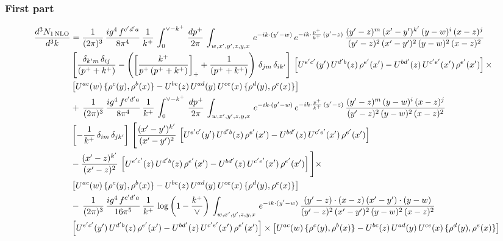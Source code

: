 \documentclass[9pt]{article}
\numberwithin{equation}{section}
\begin{document}
\subsubsection{First part}
\begin{align}
     \frac{d^{3}N_{1\,\rm NLO}}{d^{3}k} & =  \frac{1}{(2\pi)^{3}}\, \frac{ig^{4}\,f^{c'd'a}}{8\pi^{4}}\, \frac{1}{k^{+}}\,\int_{0}^{\vee-k^{+}}\,  \frac{dp^{+}}{2\pi}\, \int_{w,x',y',z,y,x}\, e^{-ik\cdot (y'-w)}\, e^{-ik\cdot \frac{p^{+}}{k^{+}}\,(y'-z)}\,\frac{(y'-z)^{m}\,(x'-y')^{k'}\,(y-w)^{i}\,(x-z)^{j}}{(y'-z)^{2}\,(x'-y')^{2}\,(y-w)^{2}\,(x-z)^{2}}\notag \\ & \left[\frac{\delta_{k'm}\,\delta_{ij}}{(p^{+}+k^{+})}-\left(\left[\frac{k^{+}}{p^{+}\,(p^{+}+k^{+})}\right]_{+}+\frac{1}{(p^{+}+k^{+})}\right)\,\delta_{jm}\,\delta_{ik'}\right]\, \left[U^{e'c'}(y')\,U^{d'b}(z)\,\rho^{e'}(x')-U^{bd'}(z)\,U^{c'e'}(x')\,\rho^{e'}(x')\right]\times\notag \\ &  \left[U^{ac}(w)\, \{\rho^{c}(y),\rho^{b}(x)\}-U^{bc}(z)\,U^{ad}(y)\,U^{ce}(x)\,\{\rho^{d}(y),\rho^{e}(x)\}\right] \notag \\
&  +\,\frac{1}{(2\pi)^{3}}\, \frac{ig^{4}\,f^{c'd'a}}{8\pi^{4}}\, \frac{1}{k^{+}}\,\int_{0}^{\vee-k^{+}}\,  \frac{dp^{+}}{2\pi}\, \int_{w,x',y',z,y,x}\, e^{-ik\cdot (y'-w)}\, e^{-ik\cdot \frac{p^{+}}{k^{+}}\,(y'-z)}\,\frac{(y'-z)^{m}\,(y-w)^{i}\,(x-z)^{j}}{(y'-z)^{2}\,(y-w)^{2}\,(x-z)^{2}}\notag \\ &   \left[-\frac{1}{k^{+}}\, \delta_{im}\, \delta_{jk'}\right]\, \Bigg[\frac{(x'-y')^{k'}}{(x'-y')^{2}}\,\left[U^{e'c'}(y')\,U^{d'b}(z)\,\rho^{e'}(x')-U^{bd'}(z)\,U^{c'e'}(x')\,\rho^{e'}(x')\right]\notag \\ & -\frac{(x'-z)^{k'}}{(x'-z)^{2}}\,\left[U^{e'c'}(z)\,U^{d'b}(z)\,\rho^{e'}(x')-U^{bd'}(z)\,U^{c'e'}(x')\,\rho^{e'}(x')\right]\Bigg]\times\notag \\ &   \left[U^{ac}(w)\, \{\rho^{c}(y),\rho^{b}(x)\}-U^{bc}(z)\,U^{ad}(y)\,U^{ce}(x)\,\{\rho^{d}(y),\rho^{e}(x)\}\right] \notag \\
& -\,\frac{1}{(2\pi)^{3}}\, \frac{ig^{4}\,f^{c'd'a}}{16\pi^{5}}\, \frac{1}{k^{+}}\,\log{\left(1-\frac{k^{+}}{\vee}\right)}\, \int_{w,x',y',z,y,x}\, e^{-ik\cdot (y'-w)}\,\frac{(y'-z)\cdot (x-z)\,(x'-y')\cdot (y-w)}{(y'-z)^{2}\,(x'-y')^{2}\,(y-w)^{2}\,(x-z)^{2}}\notag \\ &  \left[U^{e'c'}(y')\,U^{d'b}(z)\,\rho^{e'}(x')-U^{bd'}(z)\,U^{c'e'}(x')\,\rho^{e'}(x')\right]\times  \left[U^{ac}(w)\, \{\rho^{c}(y),\rho^{b}(x)\}-U^{bc}(z)\,U^{ad}(y)\,U^{ce}(x)\,\{\rho^{d}(y),\rho^{e}(x)\}\right]
\end{align}
\end{document}
